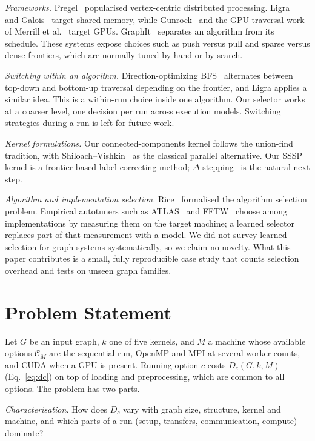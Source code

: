 \documentclass[conference]{IEEEtran}
\begin{document}
\textit{Frameworks.} Pregel~\cite{pregel} popularised vertex-centric distributed processing. Ligra~\cite{ligra} and Galois~\cite{galois} target shared memory, while Gunrock~\cite{gunrock} and the GPU traversal work of Merrill et al.~\cite{merrill} target GPUs. GraphIt~\cite{graphit} separates an algorithm from its schedule. These systems expose choices such as push versus pull and sparse versus dense frontiers, which are normally tuned by hand or by search.

\textit{Switching within an algorithm.} Direction-optimizing BFS~\cite{dobfs} alternates between top-down and bottom-up traversal depending on the frontier, and Ligra applies a similar idea. This is a within-run choice inside one algorithm. Our selector works at a coarser level, one decision per run across execution models. Switching strategies during a run is left for future work.

\textit{Kernel formulations.} Our connected-components kernel follows the union-find tradition, with Shiloach--Vishkin~\cite{sv} as the classical parallel alternative. Our SSSP kernel is a frontier-based label-correcting method; $\Delta$-stepping~\cite{delta} is the natural next step.

\textit{Algorithm and implementation selection.} Rice~\cite{rice} formalised the algorithm selection problem. Empirical autotuners such as ATLAS~\cite{atlas} and FFTW~\cite{fftw} choose among implementations by measuring them on the target machine; a learned selector replaces part of that measurement with a model. We did not survey learned selection for graph systems systematically, so we claim no novelty. What this paper contributes is a small, fully reproducible case study that counts selection overhead and tests on unseen graph families.

\section{Problem Statement}
Let $G$ be an input graph, $k$ one of five kernels, and $M$ a machine whose available options $\mathcal{C}_M$ are the sequential run, OpenMP and MPI at several worker counts, and CUDA when a GPU is present. Running option $c$ costs $D_c(G,k,M)$ (Eq.~\ref{eq:dc}) on top of loading and preprocessing, which are common to all options. The problem has two parts.

\emph{Characterisation.} How does $D_c$ vary with graph size, structure, kernel and machine, and which parts of a run (setup, transfers, communication, compute) dominate?
\end{document}
